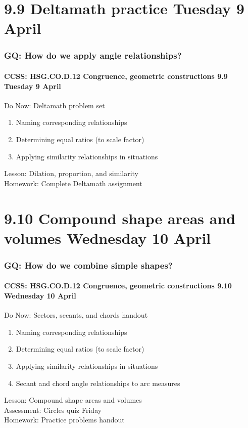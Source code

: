 \documentclass{beamer}
\begin{document}
\section{9.9 Deltamath practice Tuesday 9 April}
  \frame
  {
    \frametitle{GQ: How do we apply angle relationships?}
    \framesubtitle{CCSS: HSG.CO.D.12 Congruence, geometric constructions \hfill \alert{9.9 Tuesday 9 April}}

    \begin{block}{Do Now: Deltamath problem set}
      \begin{enumerate}
        \item Naming corresponding relationships
        \item Determining equal ratios (to scale factor)
        \item Applying similarity relationships in situations
      \end{enumerate}
    \end{block}
    Lesson: Dilation, proportion, and similarity\\
    Homework: Complete Deltamath assignment
  }

\section{9.10 Compound shape areas and volumes Wednesday 10 April}
  \frame
  {
    \frametitle{GQ: How do we combine simple shapes?}
    \framesubtitle{CCSS: HSG.CO.D.12 Congruence, geometric constructions \hfill \alert{9.10 Wednesday 10 April}}

    \begin{block}{Do Now: Sectors, secants, and chords handout}
      \begin{enumerate}
        \item Naming corresponding relationships
        \item Determining equal ratios (to scale factor)
        \item Applying similarity relationships in situations
        \item Secant and chord angle relationships to arc measures
      \end{enumerate}
    \end{block}
    Lesson: Compound shape areas and volumes\\
    Assessment: Circles quiz Friday\\
    Homework: Practice problems handout
  }
\end{document}
